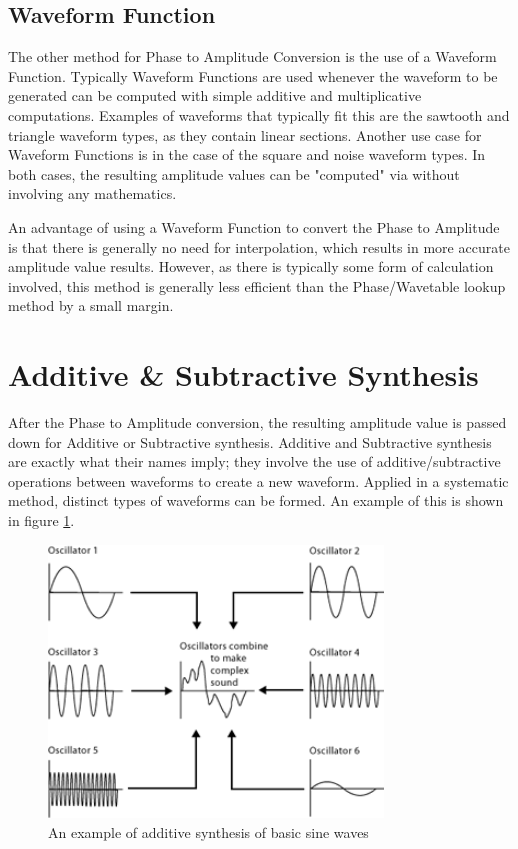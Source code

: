 \documentclass[a4paper,12pt]{report}
\begin{document}
\subsection{Waveform Function}
\label{subsec:waveformfunction}
The other method for Phase to Amplitude Conversion is the use of a Waveform Function. Typically Waveform Functions are used whenever the waveform to be generated can be computed with simple additive and multiplicative computations. Examples of waveforms that typically fit this are the sawtooth and triangle waveform types, as they contain linear sections. Another use case for Waveform Functions is in the case of the square and noise waveform types. In both cases, the resulting amplitude values can be "computed" via without involving any mathematics.

An advantage of using a Waveform Function to convert the Phase to Amplitude is that there is generally no need for interpolation, which results in more accurate amplitude value results. However, as there is typically some form of calculation involved, this method is generally less efficient than the Phase/Wavetable lookup method by a small margin.

\section{Additive \& Subtractive Synthesis}
\label{sec:addsubsynthesis}
After the Phase to Amplitude conversion, the resulting amplitude value is passed down for Additive or Subtractive synthesis. Additive and Subtractive synthesis are exactly what their names imply; they involve the use of additive/subtractive operations between waveforms to create a new waveform. Applied in a systematic method, distinct types of waveforms can be formed. An example of this is shown in figure \ref{fig:additivesynthesis}.

\begin{figure}
    \centering
    \includegraphics[width=24em]{AdditiveSynthesis.png}
    \caption{An example of additive synthesis of basic sine waves}
    \label{fig:additivesynthesis}
\end{figure}
\end{document}
